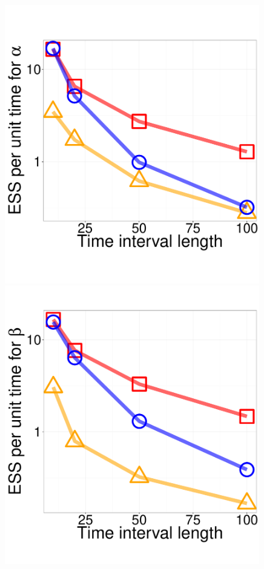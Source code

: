 {  \begin{figure}%
  \centering
  \begin{minipage}[hp]{0.24\linewidth}
  \centering
    \includegraphics [width=0.99\textwidth, angle=0]{figs/ESS_vs_t_alpha_fixobservation.pdf}
    \end{minipage}
  \begin{minipage}[hp]{0.24\linewidth}
  \centering
    \includegraphics [width=0.99\textwidth, angle=0]{figs/ESS_vs_t_beta_fixobservation.pdf}

\end{minipage}
\end{figure}}

